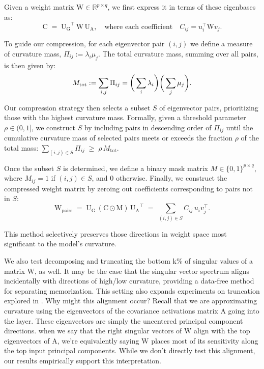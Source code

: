 \documentclass{article} %
\newcommand{\matr}[1]{\ensuremath{\bm{\mathrm{#1}}}}
\begin{document}
Given a weight matrix \( \matr{W} \in \mathbb{R}^{p\times q} \), we first express it in terms of these eigenbases as:
\[
\matr{C} \;=\; \matr{U_G}^\top\, \matr{W} \, \matr{U_A},\quad\text{where each coefficient}\quad C_{ij} = u_i^\top \matr{W} v_j.
\]

To guide our compression, for each eigenvector pair $(i,j)$ we define a measure of curvature mass,  $\Pi_{ij} := \lambda_i \mu_j.$ The total curvature mass, summing over all pairs, is then given by:
\[
M_{\mathrm{tot}} := \sum_{i,j} \Pi_{ij} = \bigg{(}\sum_i \lambda_i\bigg{)}\bigg{(}\sum_j \mu_j\bigg{)}.
\]

Our compression strategy then selects a subset \(S\) of eigenvector pairs, prioritizing those with the highest curvature mass. Formally, given a threshold parameter \(\rho \in (0, 1]\), we construct \(S\) by including pairs in descending order of \(\Pi_{ij}\) until the cumulative curvature mass of selected pairs meets or exceeds the fraction \(\rho\) of the total mass:
\(
\sum_{(i,j)\in S}\Pi_{ij} \;\ge\; \rho\, M_{\mathrm{tot}}.
\)

Once the subset \(S\) is determined, we define a binary mask matrix \(M \in \{0,1\}^{p\times q}\), where $M_{ij} = 1$ if $(i,j)\in S$, and 0 otherwise.
Finally, we construct the compressed weight matrix by zeroing out coefficients corresponding to pairs not in \(S\):
\[
\matr{W}_{\text{pairs}} \;=\; \matr{U_G}\, (\matr{C} \odot \matr{M})\, \matr{U_A}^\top \;=\; \sum_{(i,j)\in S} C_{ij}\, u_i v_j^\top.
\]

This method selectively preserves those directions in weight space most significant to the model's curvature. 

We also test decomposing and truncating the bottom k\% of singular values of a matrix \matr{W}, as well. It may be the case that the singular vector spectrum aligns incidentally with directions of high/low curvature, providing a data-free method for separating memorization. This setting also expands experiments on truncation explored in \citet{yunis2024approaching}. Why might this alignment occur? Recall that we are approximating curvature using the eigenvectors of the covariance activations matrix \matr{A} going into the layer. These eigenvectors are simply the uncentered principal component directions. when we say that the right singular vectors of \matr{W} align with the top eigenvectors of \matr{A}, we’re equivalently saying \matr{W} places most of its sensitivity along the top input principal components. While we don't directly test this alignment, our results empirically support this interpretation.
\end{document}
